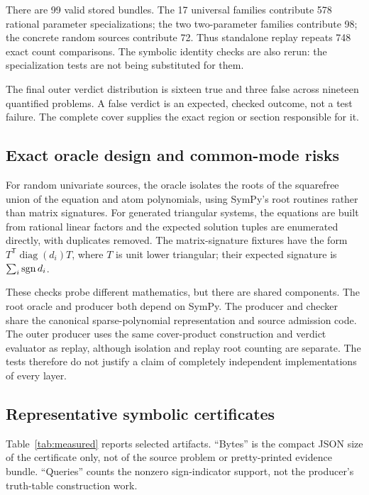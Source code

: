 There are 99 valid stored bundles. The 17 universal families contribute 578 rational parameter specializations; the two two-parameter families contribute 98; the concrete random sources contribute 72. Thus standalone replay repeats 748 exact count comparisons. The symbolic identity checks are also rerun: the specialization tests are not being substituted for them.

The final outer verdict distribution is sixteen true and three false across nineteen quantified problems. A false verdict is an expected, checked outcome, not a test failure. The complete cover supplies the exact region or section responsible for it.

\subsection{Exact oracle design and common-mode risks}

For random univariate sources, the oracle isolates the roots of the squarefree union of the equation and atom polynomials, using SymPy's root routines rather than matrix signatures. For generated triangular systems, the equations are built from rational linear factors and the expected solution tuples are enumerated directly, with duplicates removed. The matrix-signature fixtures have the form $T^{\mathsf T}\operatorname{diag}(d_i)T$, where $T$ is unit lower triangular; their expected signature is $\sum_i\operatorname{sgn} d_i$.

These checks probe different mathematics, but there are shared components. The root oracle and producer both depend on SymPy. The producer and checker share the canonical sparse-polynomial representation and source admission code. The outer producer uses the same cover-product construction and verdict evaluator as replay, although isolation and replay root counting are separate. The tests therefore do not justify a claim of completely independent implementations of every layer.

\subsection{Representative symbolic certificates}

Table~\ref{tab:measured} reports selected artifacts. ``Bytes'' is the compact JSON size of the certificate only, not of the source problem or pretty-printed evidence bundle. ``Queries'' counts the nonzero sign-indicator support, not the producer's truth-table construction work.

